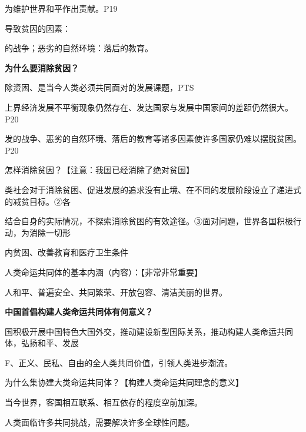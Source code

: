 \documentclass[lang=cn,11pt]{elegantbook}
\newcommand{\daofasym}[1]{{\daofasymbolfont #1}}
\newcommand{\daofasym}[1]{#1}
\begin{document}
为维护世界和平作出责献。P19\par

导致贫因的因素：\par

的战争；恶劣的自然环境：落后的教育。\par

\textbf{为什么要消除贫因？}\par

除资困、是当今人类必须共同面对的发展课题，PTS\par

上界经济发展不平衡现象仍然存在、发达国家与发展中国家间的差距仍然很大。P20\par

发的战争、恶劣的自然环境、落后的教育等诸多因素使许多国家仍难以摆脱贫困。P20\par

怎样消除贫因？【注意：我国已经消除了绝对贫国】\par

类社会对于消除贫困、促进发展的追求没有止境、在不同的发展阶段设立了递进式的减贫目标。\daofasym{②}各\par

结合自身的实际情况，不探索消除贫困的有效途径。\daofasym{③}面对问题，世界各国积极行动，为消除一切形\par

内贫困、改善教育和医疗卫生条件\par

人类命运共同体的基本内涵（内容）：【非常非常重要】\par

人和平、普遍安全、共同繁荣、开放包容、清洁美丽的世界。\par

\textbf{中国首倡构建人类命运共同体有何意义？}\par

国积极开展中国特色大国外交，推动建设新型国际关系，推动构建人类命运共同体，弘扬和平、发展\par

F、正义、民私、自由的全人类共同价值，引领人类进步潮流。\par

为什么集协建大类命运共同体？【构建人类命运共同理念的意义】\par

当今世界，客国相互联系、相互依存的程度空前加深。\par

人类面临许多共同挑战，需要解决许多全球性问题。\par
\end{document}
